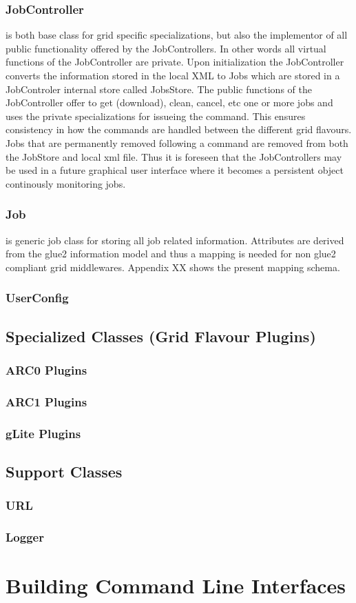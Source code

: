 \documentclass{book}
\begin{document}
\subsection{JobController} is both base class for grid specific specializations, but also the implementor of all public functionality 
offered by the JobControllers. In other words all virtual functions of the JobController are private. Upon initialization the 
JobController converts the information stored in the local XML to Jobs which are stored in a JobControler internal store called JobsStore. 
The public functions of the JobController offer to get (download), clean, cancel, etc one or more jobs and uses the private specializations 
for issueing the command. This ensures consistency in how the commands are handled between the different grid flavours. Jobs that are 
permanently removed following a command are removed from both the JobStore and local xml file. Thus it is foreseen that the JobControllers 
may be used in a future graphical user interface where it becomes a persistent object continously monitoring jobs.

\subsection{Job} is generic job class for storing all job related information. Attributes are derived from the glue2 information model 
and thus a mapping is needed for non glue2 compliant grid middlewares. Appendix XX shows the present mapping schema.

\subsection{UserConfig}

\section{Specialized Classes (Grid Flavour Plugins)}
\label{sec:plugins}
\subsection{ARC0 Plugins}
\subsection{ARC1 Plugins}
\subsection{gLite Plugins}

\section{Support Classes}
\subsection{URL}
\subsection{Logger}

\chapter{Building Command Line Interfaces}
\label{sec:cli}


\end{document}
